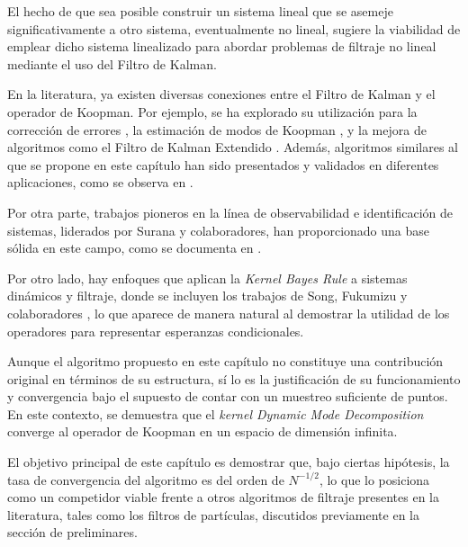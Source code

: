 El hecho de que sea posible construir un sistema lineal que se asemeje significativamente a otro sistema, eventualmente no lineal, sugiere la viabilidad de emplear dicho sistema linealizado para abordar problemas de filtraje no lineal mediante el uso del Filtro de Kalman. 

En la literatura, ya existen diversas conexiones entre el Filtro de Kalman y el operador de Koopman. Por ejemplo, se ha explorado su utilización para la corrección de errores \cite{Jiang2022CorrectingFilters}, la estimación de modos de Koopman \cite{Liu2024EstimateFilter}, y la mejora de algoritmos como el Filtro de Kalman Extendido \cite{Ramadan2024ExtendedControl}. Además, algoritmos similares al que se propone en este capítulo han sido presentados y validados en diferentes aplicaciones, como se observa en \cite{Wang2022KoopmanSystem, Wang2023Innovation-saturatedOutliers, Netto2018RobustEstimation, Syed2021Koopman-basedXFEL, HuangData-DrivenFlight}. 

Por otra parte, trabajos pioneros en la línea de observabilidad e identificación de sistemas, liderados por Surana y colaboradores, han proporcionado una base sólida en este campo, como se documenta en \cite{Surana2016KoopmanSystems, Surana2016LinearFramework}.

Por otro lado, hay enfoques que aplican la \textit{Kernel Bayes Rule} a sistemas dinámicos y filtraje, donde se incluyen los trabajos de Song, Fukumizu y colaboradores \cite{Fukumizu2004DimensionalitySpaces, Fukumizu2013KernelKernels, Fukumizu2015NonparametricEmbedding, Song2009HilbertSystems, Song2013KernelModels}, lo que aparece de manera natural al demostrar la utilidad de los operadores para representar esperanzas condicionales.

Aunque el algoritmo propuesto en este capítulo no constituye una contribución original en términos de su estructura, sí lo es la justificación de su funcionamiento y convergencia bajo el supuesto de contar con un muestreo suficiente de puntos. En este contexto, se demuestra que el \textit{kernel Dynamic Mode Decomposition} converge al operador de Koopman en un espacio de dimensión infinita. 

El objetivo principal de este capítulo es demostrar que, bajo ciertas hipótesis, la tasa de convergencia del algoritmo es del orden de $N^{-1/2}$, lo que lo posiciona como un competidor viable frente a otros algoritmos de filtraje presentes en la literatura, tales como los filtros de partículas, discutidos previamente en la sección de preliminares.

